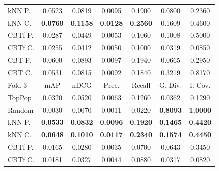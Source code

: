 \begin{table}[hbt]
\begin{tabulary}{\textwidth}{|L|CCCCCC|}
kNN P. & 0.0523 &           0.0819 &           0.0095 &           0.1900 &                                            0.0800 &                                            0.2360 \\
kNN C. & \textbf{0.0769} &  \textbf{0.1158} &  \textbf{0.0128} &  \textbf{0.2560} &                                            0.1609 &                                            0.4600 \\
CBTf P. & 0.0287 &           0.0449 &           0.0053 &           0.1060 &                                            0.1008 &                                            0.5000 \\
CBTf C. & 0.0255 &           0.0412 &           0.0050 &           0.1000 &                                            0.0319 &                                            0.0850 \\
CBT P. & 0.0600 &           0.0893 &           0.0097 &           0.1940 &                                            0.0665 &                                            0.2950 \\
CBT C. & 0.0531 &           0.0815 &           0.0092 &           0.1840 &                                            0.3219 &                                            0.8170 \\
\hline
\hline
Fold 3 & mAP & nDCG & Prec. & Recall & G. Div. & I. Cov. \\
\hline
TopPop & 0.0320 &           0.0520 &           0.0063 &           0.1260 &                                            0.0362 &                                            0.1290 \\
Random & 0.0030 &           0.0070 &           0.0011 &           0.0220 &                                   \textbf{0.8093} &                                   \textbf{1.0000} \\
kNN P. & \textbf{0.0533} &  \textbf{0.0832} &  \textbf{0.0096} &  \textbf{0.1920} &                                   \textbf{0.1465} &                                   \textbf{0.4420} \\
kNN C. & \textbf{0.0648} &  \textbf{0.1010} &  \textbf{0.0117} &  \textbf{0.2340} &                                   \textbf{0.1574} &                                   \textbf{0.4450} \\
CBTf P. & 0.0165 &           0.0280 &           0.0035 &           0.0700 &                                            0.0643 &                                            0.3450 \\
CBTf C. & 0.0181 &           0.0327 &           0.0044 &           0.0880 &                                            0.0317 &                                            0.0820 \\

\end{tabulary}
\end{table}
